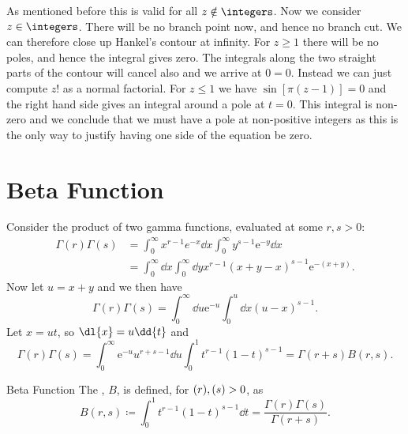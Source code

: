 \documentclass[fleqn]{NotesClass}
\newcommand*{\e}{\mathrm{e}}
\let\Re\relax
\DeclareMathOperator{\Re}{Re}
\begin{document}
    As mentioned before this is valid for all \(z \notin \integers\).
    Now we consider \(z \in \integers\).
    There will be no branch point now, and hence no branch cut.
    We can therefore close up Hankel's contour at infinity.
    For \(z \ge 1\) there will be no poles, and hence the integral gives zero.
    The integrals along the two straight parts of the contour will cancel also and we arrive at \(0 = 0\).
    Instead we can just compute \(z!\) as a normal factorial.
    For \(z \le 1\) we have \(\sin[\pi(z - 1)] = 0\) and the right hand side gives an integral around a pole at \(t = 0\).
    This integral is non-zero and we conclude that we must have a pole at non-positive integers as this is the only way to justify having one side of the equation be zero.
    
    \section{Beta Function}
    Consider the product of two gamma functions, evaluated at some \(r, s > 0\):
    \begin{align}
        \Gamma(r)\Gamma(s) &= \int_{0}^{\infty} x^{r-1}e^{-x}\dd{x} \int_{0}^{\infty} y^{s-1}\e^{-y}\dd{x}\\
        &= \int_{0}^{\infty} \dd{x} \int_{0}^{\infty} \dd{y} x^{r - 1}(x + y - x)^{s - 1}\e^{-(x + y)}.
    \end{align}
    Now let \(u = x + y\) and we then have
    \begin{equation}
        \Gamma(r) \Gamma(s) = \int_{0}^{\infty} \dd{u} \e^{-u} \int_{0}^{u} \dd{x} (u - x)^{s - 1}.
    \end{equation}
    Let \(x = ut\), so \(\dl{x} = u\dd{t}\) and
    \begin{equation}
        \Gamma(r) \Gamma(s) = \int_{0}^{\infty} \e^{-u} u^{r+s-1} \dd{u} \int_0^1 t^{r -1}(1 - t)^{s-1} = \Gamma(r + s) B(r, s).
    \end{equation}
    
    \begin{dfn}{Beta Function}{}
        The , \(B\), is defined, for \(\Re(r), \Re(s) > 0\), as
        \begin{equation}
            B(r, s) \coloneqq \int_0^1 t^{r - 1}(1 - t)^{s - 1} \dd{t} = \frac{\Gamma(r)\Gamma(s)}{\Gamma(r + s)}.
        \end{equation}
    \end{dfn}
    
\end{document}
